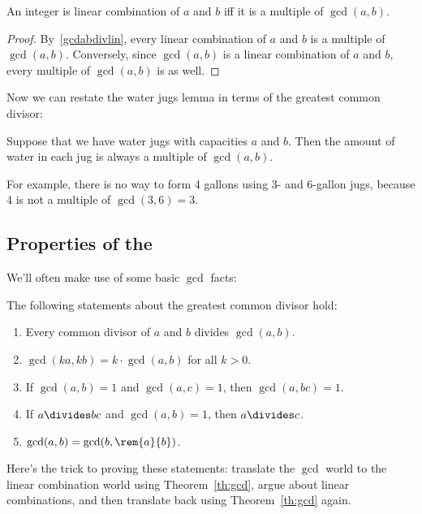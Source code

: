 \begin{editingnotes}
\begin{corollary}\label{cor:lin-comb} An integer is linear combination of $a$ and $b$
iff it is a multiple of $\gcd(a, b)$.  \end{corollary}

\begin{proof} By~\eqref{gcdabdivlin}, every linear combination of $a$ and $b$ is a
multiple of $\gcd(a, b)$.  Conversely, since $\gcd(a, b)$ is a linear combination of $a$
and $b$, every multiple of $\gcd(a, b)$ is as well.  \end{proof}

Now we can restate the water jugs lemma in terms of the greatest common
divisor: \begin{corollary} \label{cor:waterjugs} Suppose that we have water jugs with
capacities $a$ and $b$.  Then the amount of water in each jug is always a multiple of
$\gcd(a, b)$.  \end{corollary}

For example, there is no way to form 4 gallons using 3- and 6-gallon jugs, because 4 is
not a multiple of $\gcd(3, 6) = 3$.

\subsection{Properties of the }

We'll often make use of some basic $\gcd$ facts:

\begin{lemma} The following statements about the greatest common divisor
hold: \label{lem:gcd} 
\begin{enumerate}
\item Every common divisor of $a$ and $b$ divides $\gcd(a, b)$.
\item\label{gcd2} $\gcd(k a, k b) = k \cdot \gcd(a, b)$ for all $k > 0$.
\item\label{gcd3} If $\gcd(a, b) = 1$ and $\gcd(a, c) = 1$, then $\gcd(a, bc) = 1$.
\item\label{gcd4} If $a \divides b c$ and $\gcd(a, b) = 1$, then $a \divides c$.
\item\label{gcd5} $\gcd(a, b) = \gcd(b, \rem{a}{b})$.
\end{enumerate}
\end{lemma}

Here's the trick to proving these statements: translate the $\gcd$ world to the linear
combination world using Theorem~\ref{th:gcd}, argue about linear combinations, and then
translate back using Theorem~\ref{th:gcd} again.


\end{editingnotes}
